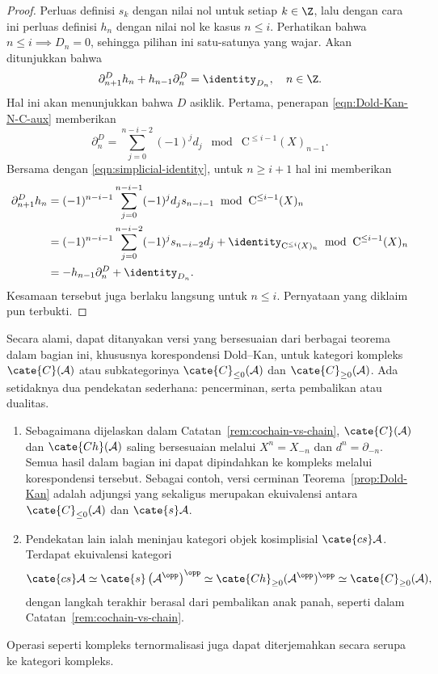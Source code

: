 \begin{proof}
	Perluas definisi $s_k$ dengan nilai nol untuk setiap $k\in\Z$, lalu dengan
	cara ini perluas definisi $h_n$ dengan nilai nol ke kasus $n\leq i$.
	Perhatikan bahwa $n\leq i\implies D_n=0$, sehingga pilihan ini satu-satunya
	yang wajar. Akan ditunjukkan bahwa
	\[ \partial^D_{n+1}h_n+h_{n-1}\partial^D_n=\identity_{D_n}, \quad n\in\Z. \]
	Hal ini akan menunjukkan bahwa $D$ asiklik. Pertama, penerapan
	\eqref{eqn:Dold-Kan-N-C-aux} memberikan
	\[ \partial^D_n = \sum_{j=0}^{n-i-2} (-1)^j d_j \;\bmod\; \mathrm{C}^{\leq i-1}(X)_{n-1}. \]
	Bersama dengan \eqref{eqn:simplicial-identity}, untuk $n\geq i+1$ hal ini
	memberikan
	\begin{align*}
		\partial^D_{n+1} h_n & = (-1)^{n-i-1} \sum_{j=0}^{n-i-1} (-1)^j d_j s_{n-i-1} \; \bmod\; \mathrm{C}^{\leq i-1}(X)_n \\
		& = (-1)^{n-i-1} \sum_{j=0}^{n-i-2} (-1)^j s_{n-i-2} d_j + \identity_{\mathrm{C}^{\leq i}(X)_n} \; \bmod\; \mathrm{C}^{\leq i-1}(X)_n \\
		& = -h_{n-1} \partial^D_n + \identity_{D_n}.
	\end{align*}
	Kesamaan tersebut juga berlaku langsung untuk $n\leq i$. Pernyataan
	yang diklaim pun terbukti.
\end{proof}

\begin{remark}
	Secara alami, dapat ditanyakan versi yang bersesuaian dari berbagai
	teorema dalam bagian ini, khususnya korespondensi Dold--Kan, untuk kategori
	kompleks $\cate{C}(\mathcal{A})$ atau subkategorinya
	$\cate{C}_{\leq0}(\mathcal{A})$ dan $\cate{C}_{\geq0}(\mathcal{A})$.
	Ada setidaknya dua pendekatan sederhana: pencerminan, serta pembalikan
	atau dualitas.
	\begin{enumerate}
		\item Sebagaimana dijelaskan dalam
		Catatan~\ref{rem:cochain-vs-chain}, $\cate{C}(\mathcal{A})$ dan
		$\cate{Ch}(\mathcal{A})$ saling bersesuaian melalui $X^n=X_{-n}$ dan
		$d^n=\partial_{-n}$. Semua hasil dalam bagian ini dapat dipindahkan ke
		kompleks melalui korespondensi tersebut. Sebagai contoh, versi cerminan
		Teorema~\ref{prop:Dold-Kan} adalah adjungsi yang sekaligus merupakan ekuivalensi antara
		$\cate{C}_{\leq0}(\mathcal{A})$ dan $\cate{s}\mathcal{A}$.
		\item Pendekatan lain ialah meninjau kategori objek kosimplisial
		$\cate{cs}\mathcal{A}$. Terdapat ekuivalensi kategori
		\[ \cate{cs}\mathcal{A} \simeq \cate{s}\left(\mathcal{A}^{\opp}\right)^{\opp} \simeq \cate{Ch}_{\geq 0}(\mathcal{A}^{\opp})^{\opp} \simeq \cate{C}_{\geq 0}(\mathcal{A}), \]
		dengan langkah terakhir berasal dari pembalikan anak panah, seperti dalam
		Catatan~\ref{rem:cochain-vs-chain}.
	\end{enumerate}
	Operasi seperti kompleks ternormalisasi juga dapat diterjemahkan secara
	serupa ke kategori kompleks.
\end{remark}
